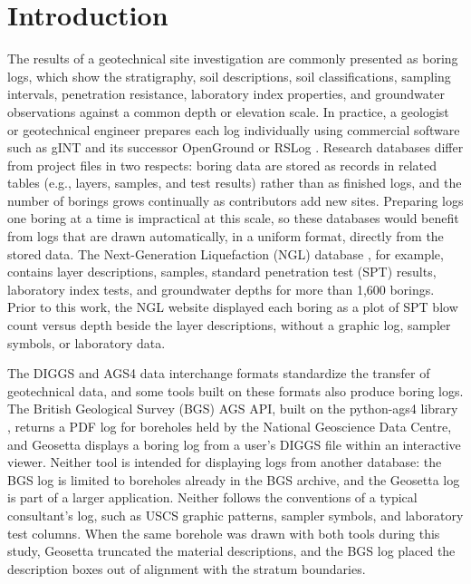 \documentclass[Journal,letterpaper,InsideFigs]{ascelike-new}
\begin{document}
\section{Introduction}

The results of a geotechnical site investigation are commonly presented as boring logs, which show the stratigraphy, soil descriptions, soil classifications, sampling intervals, penetration resistance, laboratory index properties, and groundwater observations against a common depth or elevation scale. In practice, a geologist or geotechnical engineer prepares each log individually using commercial software such as gINT and its successor OpenGround \cite{Bentley2026} or RSLog \cite{Rocscience2026}. Research databases differ from project files in two respects: boring data are stored as records in related tables (e.g., layers, samples, and test results) rather than as finished logs, and the number of borings grows continually as contributors add new sites. Preparing logs one boring at a time is impractical at this scale, so these databases would benefit from logs that are drawn automatically, in a uniform format, directly from the stored data. The Next-Generation Liquefaction (NGL) database \cite{Brandenberg2020,Ulmer2023}, for example, contains layer descriptions, samples, standard penetration test (SPT) results, laboratory index tests, and groundwater depths for more than 1,600 borings. Prior to this work, the NGL website displayed each boring as a plot of SPT blow count versus depth beside the layer descriptions, without a graphic log, sampler symbols, or laboratory data.

The DIGGS \cite{DIGGS2026} and AGS4 \cite{AGS2026} data interchange formats standardize the transfer of geotechnical data, and some tools built on these formats also produce boring logs. The British Geological Survey (BGS) AGS API, built on the python-ags4 library \cite{Senanayake2022}, returns a PDF log for boreholes held by the National Geoscience Data Centre, and Geosetta \cite{Geosetta2026} displays a boring log from a user's DIGGS file within an interactive viewer. Neither tool is intended for displaying logs from another database: the BGS log is limited to boreholes already in the BGS archive, and the Geosetta log is part of a larger application. Neither follows the conventions of a typical consultant's log, such as USCS graphic patterns, sampler symbols, and laboratory test columns. When the same borehole was drawn with both tools during this study, Geosetta truncated the material descriptions, and the BGS log placed the description boxes out of alignment with the stratum boundaries.
\end{document}
